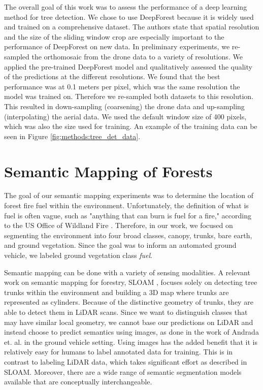 The overall goal of this work was to assess the performance of a deep learning method for tree detection. We chose to use DeepForest \cite{Weinstein2020DeepForest:Delineation} because it is widely used and trained on a comprehensive dataset.
The authors state that spatial resolution and the size of the sliding window crop are especially important to the performance of DeepForest on new data. In preliminary experiments, we re-sampled the orthomosaic from the drone data to a variety of resolutions. We applied the pre-trained DeepForest model and qualitatively assessed the quality of the predictions at the different resolutions. We found that the best performance was at 0.1 meters per pixel, which was the same resolution the model was trained on. Therefore we re-sampled both datasets to this resolution. This resulted in down-sampling (coarsening) the drone data and up-sampling (interpolating) the aerial data. We used the default window size of 400 pixels, which was also the size used for training. An example of the training data can be seen in Figure \ref{fig:methods:tree_det_data}.


\section{Semantic Mapping of Forests}
\label{sec:methods:sem_mapping}
The goal of our semantic mapping experiments was to determine the location of forest fire fuel within the environment. Unfortunately, the definition of what is fuel is often vague, such as "anything that can burn is fuel for a fire," according to the US Office of Wildland Fire \cite{Fire2021FuelsManagement}. Therefore, in our work, we focused on segmenting the environment into four broad classes, canopy, trunks, bare earth, and ground vegetation. Since the goal was to inform an automated ground vehicle, we labeled ground vegetation class \textit{fuel}.

Semantic mapping can be done with a variety of sensing modalities. A relevant work on semantic mapping for forestry, SLOAM \cite{Chen2020SLOAM:Inventory}, focuses solely on detecting tree trunks within the environment and building a 3D map where trunks are represented as cylinders. Because of the distinctive geometry of trunks, they are able to detect them in LiDAR scans. Since we want to distinguish classes that may have similar local geometry, we cannot base our predictions on LiDAR and instead choose to predict semantics using images, as done in the work of Andrada et. al. \cite{Andrada2020} in the ground vehicle setting. Using images has the added benefit that it is relatively easy for humans to label annotated data for training. This is in contrast to labeling LiDAR data, which takes significant effort as described in SLOAM. Moreover, there are a wide range of semantic segmentation models available that are conceptually interchangeable. 

